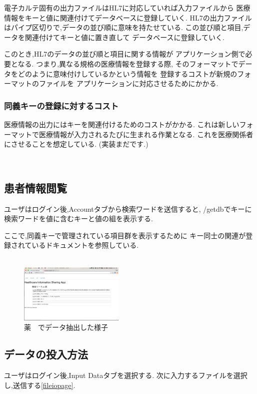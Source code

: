 	電子カルテ固有の出力ファイルはHL7に対応していれば入力ファイルから
	医療情報をキーと値に関連付けてデータベースに登録していく.
	HL7の出力ファイルはパイプ区切りで,データの並び順に意味を持たせている.
	この並び順と項目,データを関連付けてキーと値に置き直して
	データベースに登録していく.

	このとき,HL7のデータの並び順と項目に関する情報が
	アプリケーション側で必要となる.
	つまり,異なる規格の医療情報を登録する際,
	そのフォーマットでデータをどのように意味付けしているかという情報を
	登録するコストが新規のフォーマットのファイルを
	アプリケーションに対応させるためにかかる.


	\subsubsection{同義キーの登録に対するコスト}
	医療情報の出力にはキーを関連付けるためのコストがかかる.
	これは新しいフォーマットで医療情報が入力されるたびに生まれる作業となる.
	これを医療関係者にさせることを想定している.
	(実装まだです.)



\subsection{患者情報閲覧}
	ユーザはログイン後,Accountタブから検索ワードを送信すると,
	/getdbでキーに検索ワードを値に含むキーと値の組を表示する.

	ここで,同義キーで管理されている項目群を表示するために
	キー同士の関連が登録されているドキュメントを参照している.
	\\
	\\



		\begin{figure}[htbp]
				\includegraphics[width=5cm, bb=0 0 437 688]{./gazou/getdb.png}
			\caption{薬　でデータ抽出した様子}
			\label{ss-mix_sampledata}
		\end{figure}



\subsection{データの投入方法}
	ユーザはログイン後,Input Dataタブを選択する.
	次に入力するファイルを選択し,送信する\ref{fileiopage}.

